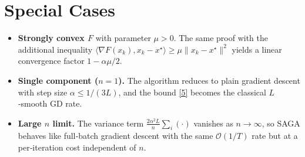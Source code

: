 \documentclass{article}
\begin{document}
\section*{Special Cases}
\begin{itemize}
    \item \textbf{Strongly convex $F$} with parameter $\mu>0$. The same proof with the additional inequality
    $\langle\nabla F(x_k),x_k-x^\star\rangle\ge \mu\|x_k-x^\star\|^2$ yields a linear convergence factor $1-\alpha\mu/2$.
    \item \textbf{Single component ($n=1$).} The algorithm reduces to plain gradient descent with step size $\alpha\le 1/(3L)$, and the bound \eqref{5} becomes the classical $L$‑smooth GD rate.
    \item \textbf{Large $n$ limit.} The variance term $ \frac{2\alpha^{2}L}{n}\sum_i(\cdot)$ vanishes as $n\to\infty$, so SAGA behaves like full‑batch gradient descent with the same $\mathcal{O}(1/T)$ rate but at a per‑iteration cost independent of $n$.
\end{itemize}
\end{document}

